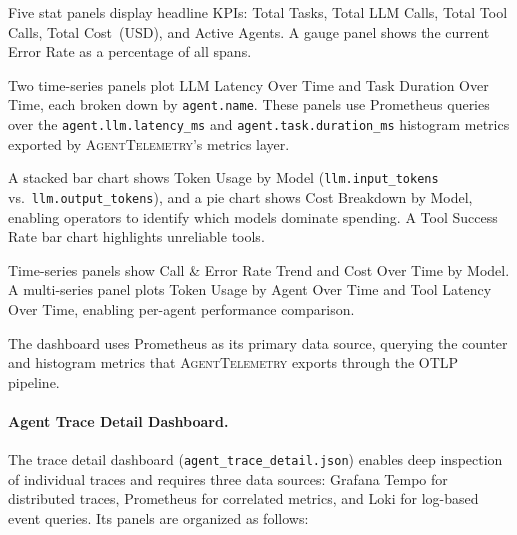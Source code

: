 \documentclass[sigconf,nonacm]{acmart}
\begin{document}
\begin{description}[leftmargin=*,nosep,style=unboxed]
    \item[Summary Statistics.]  Five stat panels display headline KPIs:
        Total Tasks, Total LLM Calls, Total Tool Calls, Total Cost~(USD),
        and Active Agents.  A gauge panel shows the current Error Rate as
        a percentage of all spans.
    \item[Latency \& Performance.]  Two time-series panels plot LLM
        Latency Over Time and Task Duration Over Time, each broken down
        by \texttt{agent.name}.  These panels use Prometheus queries over
        the \texttt{agent.llm.latency\_ms} and
        \texttt{agent.task.duration\_ms} histogram metrics exported by
        \textsc{AgentTelemetry}'s metrics layer.
    \item[Token Usage \& Cost.]  A stacked bar chart shows Token Usage
        by Model (\texttt{llm.input\_tokens} vs.\
        \texttt{llm.output\_tokens}), and a pie chart shows Cost
        Breakdown by Model, enabling operators to identify which models
        dominate spending.  A Tool Success Rate bar chart highlights
        unreliable tools.
    \item[Rate Trends \& Per-Agent Breakdown.]  Time-series panels show
        Call \& Error Rate Trend and Cost Over Time by Model.  A
        multi-series panel plots Token Usage by Agent Over Time and Tool
        Latency Over Time, enabling per-agent performance comparison.
\end{description}

The dashboard uses Prometheus as its primary data source, querying the
counter and histogram metrics that \textsc{AgentTelemetry} exports
through the OTLP pipeline.

\paragraph{Agent Trace Detail Dashboard.}
The trace detail dashboard (\texttt{agent\_trace\_detail.json}) enables
deep inspection of individual traces and requires three data sources:
Grafana Tempo for distributed traces, Prometheus for correlated metrics,
and Loki for log-based event queries.  Its panels are organized as
follows:
\end{document}
